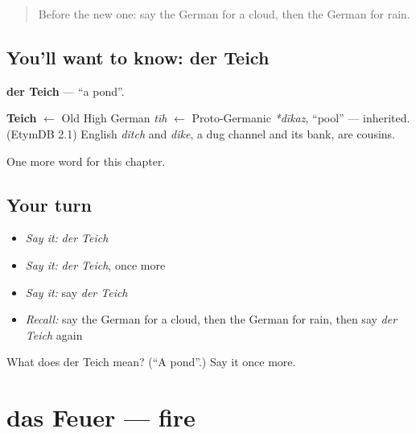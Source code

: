 \label{lesson:GE-C84-teich}



\begin{quote}
Before the new one: say the German for a cloud, then the German for rain.
\end{quote}

\subsection*{You'll want to know: der Teich}
\textbf{der Teich} — \textquotedblleft{}a pond\textquotedblright{}.

\begin{cousinweb}
\textbf{Teich} $\leftarrow$ Old High German \emph{tīh} $\leftarrow$ Proto-Germanic \emph{*dīkaz}, \textquotedblleft{}pool\textquotedblright{} — inherited. (EtymDB 2.1) English \emph{ditch} and \emph{dike}, a dug channel and its bank, are cousins.
\end{cousinweb}

\begin{grammarlens}[title={What you've built}]
One more word for this chapter.
\end{grammarlens}

\subsection*{Your turn}
\begin{itemize}
\raggedright
  \item \emph{Say it:} \emph{der Teich}
  \item \emph{Say it:} \emph{der Teich}, once more
  \item \emph{Say it:} say \emph{der Teich}
  \item \emph{Recall:} say the German for a cloud, then the German for rain, then say \emph{der Teich} again
\end{itemize}

\begin{tcolorbox}[breakable,colback=teal!4,colframe=teal!35!black,title={Before you move on}]
What does der Teich mean? (\textquotedblleft{}A pond\textquotedblright{}.) Say it once more.
\end{tcolorbox}
\section[das Feuer]{das Feuer — fire}

\label{lesson:GE-C84-feuer}



